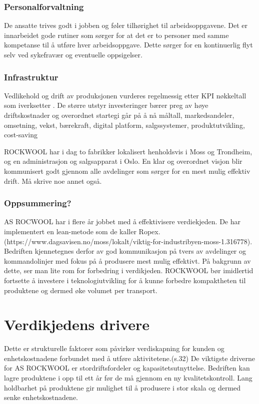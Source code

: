 \subsubsection*{Personalforvaltning}
De ansatte trives godt i jobben og føler tilhørighet til arbeidsoppgavene. Det er innarbeidet gode rutiner som sørger for at det er to personer med samme kompetanse til å utføre hver arbeidsoppgave. Dette sørger for en kontinuerlig flyt selv ved sykefravær og eventuelle oppsigelser. 

\subsubsection*{Infrastruktur}
Vedlikehold og drift av produksjonen vurderes regelmessig etter KPI nøkkeltall som iverksetter . De større utstyr investeringer bærer preg av høye driftskostnader og overordnet startegi går på å nå måltall, markedsandeler, omsetning, vekst, bærekraft, digital platform, salgssystemer, produktutvikling, cost-saving

\indent \newline
ROCKWOOL har i dag to fabrikker lokalisert henholdsvis i Moss og Trondheim, og en administrasjon og salgsapparat i Oslo. En klar og overordnet visjon blir kommunisert godt gjennom alle avdelinger som sørger for en mest mulig effektiv drift. Må skrive noe annet også.
  
\subsubsection*{Oppsummering?}
AS ROCWOOL har i flere år jobbet med å effektivisere verdiekjeden. De har implementert en lean-metode som de kaller Ropex. (https://www.dagsavisen.no/moss/lokalt/viktig-for-industribyen-moss-1.316778).
Bedriften kjennetegnes derfor av god kommunikasjon på tvers av avdelinger og kommandolinjer med fokus på å produsere mest mulig effektivt. På bakgrunn av dette, ser man lite rom for forbedring i verdikjeden. ROCKWOOL bør imidlertid fortsette å investere i teknologiutvikling for å kunne forbedre kompaktheten til produktene og dermed øke volumet per transport.

\section{Verdikjedens drivere}
Dette er strukturelle faktorer som påvirker verdiskapning for kunden og enhetskostnadene forbundet med å utføre aktivitetene.(s.32) De viktigste driverne for AS ROCKWOOL er stordriftsfordeler og kapasitetsutnyttelse. Bedriften kan lagre produktene i opp til ett år før de må gjennom en ny kvalitetskontroll. Lang holdbarhet på produktene gir mulighet til å produsere i stor skala og dermed senke enhetskostnadene.

